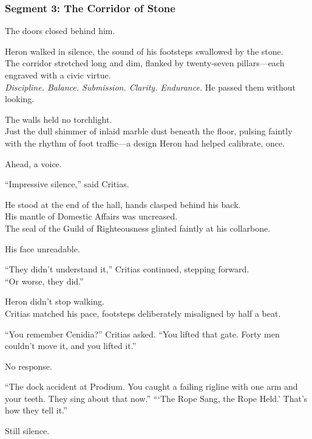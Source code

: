 \documentclass[9pt]{article}
\begin{document}
\subsubsection*{Segment 3: The Corridor of Stone}

The doors closed behind him.

Heron walked in silence, the sound of his footsteps swallowed by the stone.\\
The corridor stretched long and dim, flanked by twenty-seven pillars—each engraved with a civic virtue.\\
\textit{Discipline. Balance. Submission. Clarity. Endurance.}  
He passed them without looking.

The walls held no torchlight.\\
Just the dull shimmer of inlaid marble dust beneath the floor, pulsing faintly with the rhythm of foot traffic—a design Heron had helped calibrate, once.

Ahead, a voice.

\vspace{1em}

“Impressive silence,” said Critias.

He stood at the end of the hall, hands clasped behind his back.\\
His mantle of Domestic Affairs was uncreased.\\
The seal of the Guild of Righteousness glinted faintly at his collarbone.

His face unreadable.

\vspace{1em}

“They didn’t understand it,” Critias continued, stepping forward.\\
“Or worse, they did.”

Heron didn’t stop walking.\\
Critias matched his pace, footsteps deliberately misaligned by half a beat.

\vspace{1em}

“You remember Cenidia?” Critias asked.  
“You lifted that gate. Forty men couldn’t move it, and you lifted it.”

No response.

“The dock accident at Prodium. You caught a failing rigline with one arm and your teeth. They sing about that now.”  
“‘The Rope Sang, the Rope Held.’ That’s how they tell it.”

Still silence.
\end{document}
